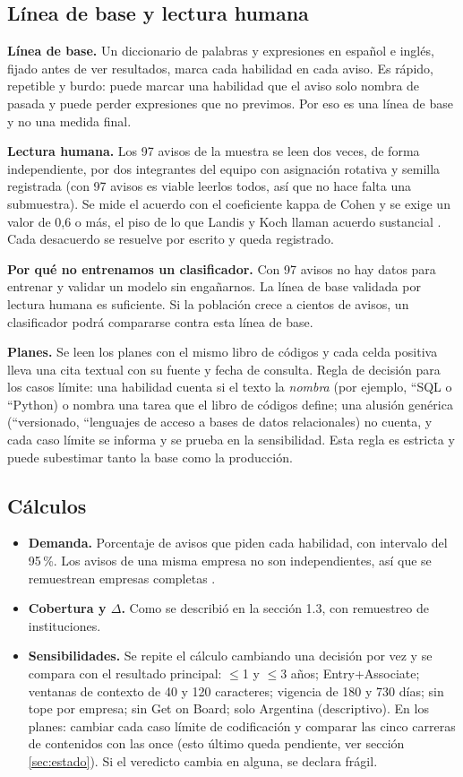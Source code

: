 \documentclass[11pt,a4paper]{article}
\renewcommand{\le}{\ensuremath{\leq}}
\begin{document}
\subsection{Línea de base y lectura humana}
\textbf{Línea de base.} Un diccionario de palabras y expresiones en español e inglés, fijado antes de ver resultados, marca cada habilidad en cada aviso. Es rápido, repetible y burdo: puede marcar una habilidad que el aviso solo nombra de pasada y puede perder expresiones que no previmos. Por eso es una línea de base y no una medida final.

\textbf{Lectura humana.} Los 97 avisos de la muestra se leen dos veces, de forma independiente, por dos integrantes del equipo con asignación rotativa y semilla registrada (con 97 avisos es viable leerlos todos, así que no hace falta una submuestra). Se mide el acuerdo con el coeficiente kappa de Cohen y se exige un valor de 0,6 o más, el piso de lo que Landis y Koch llaman acuerdo sustancial \cite{landis1977}. Cada desacuerdo se resuelve por escrito y queda registrado.

\textbf{Por qué no entrenamos un clasificador.} Con 97 avisos no hay datos para entrenar y validar un modelo sin engañarnos. La línea de base validada por lectura humana es suficiente. Si la población crece a cientos de avisos, un clasificador podrá compararse contra esta línea de base.

\textbf{Planes.} Se leen los planes con el mismo libro de códigos y cada celda positiva lleva una cita textual con su fuente y fecha de consulta. Regla de decisión para los casos límite: una habilidad cuenta si el texto la \emph{nombra} (por ejemplo, ``SQL o ``Python) o nombra una tarea que el libro de códigos define; una alusión genérica (``versionado, ``lenguajes de acceso a bases de datos relacionales) no cuenta, y cada caso límite se informa y se prueba en la sensibilidad. Esta regla es estricta y puede subestimar tanto la base como la producción.

\subsection{Cálculos}
\begin{itemize}
\item \textbf{Demanda.} Porcentaje de avisos que piden cada habilidad, con intervalo del 95\,\%. Los avisos de una misma empresa no son independientes, así que se remuestrean empresas completas \cite{efron1979}.
\item \textbf{Cobertura y $\Delta$.} Como se describió en la sección 1.3, con remuestreo de instituciones.
\item \textbf{Sensibilidades.} Se repite el cálculo cambiando una decisión por vez y se compara con el resultado principal: \le{}1 y \le{}3 años; Entry+Associate; ventanas de contexto de 40 y 120 caracteres; vigencia de 180 y 730 días; sin tope por empresa; sin Get on Board; solo Argentina (descriptivo). En los planes: cambiar cada caso límite de codificación y comparar las cinco carreras de contenidos con las once (esto último queda pendiente, ver sección \ref{sec:estado}). Si el veredicto cambia en alguna, se declara frágil.
\end{itemize}
\end{document}

